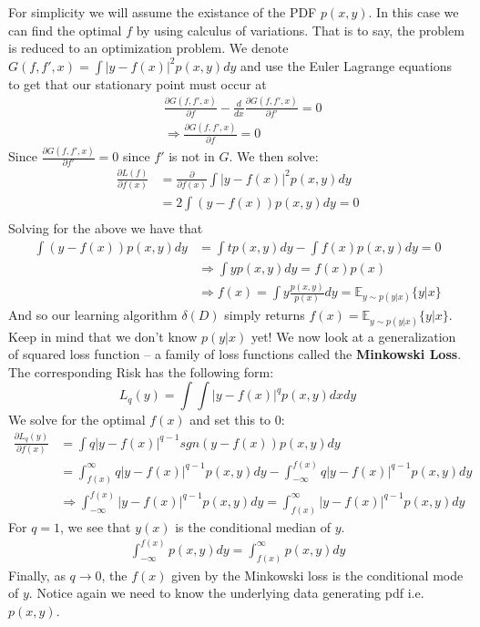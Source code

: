 \documentclass[]{article}
\theoremstyle{mattstyle}
\theoremstyle{definition}
\begin{document}
For simplicity we will assume the existance of the PDF $p(x,y)$. In this case we can find the optimal $f$ by using calculus of variations. That is to say, the problem is reduced to an optimization problem. We denote $G(f, f', x) = \int | y - f(x) |^2 p(x, y) dy$ and use the Euler Lagrange equations to get that our stationary point must occur at 
\begin{align*}
&\frac{\partial G(f, f', x)}{\partial f} - \frac{d}{dx}\frac{\partial G(f, f', x)}{\partial f'} = 0\\
&\Rightarrow \frac{\partial G(f, f', x)}{\partial f}=0
\end{align*}
Since $\frac{\partial G(f, f', x)}{\partial f'}=0$ since $f'$ is not in $G$. We then solve:
\begin{align*}
\frac{\partial L(f)}{\partial f(x)} &= \frac{\partial}{\partial f(x)}\int | y - f(x) |^2 p(x, y) dy\\
&=2 \int (y - f(x)) p(x, y) dy = 0\\
\end{align*}
Solving for the above we have that
\begin{align*}
\int (y - f(x)) p(x, y) dy &= \int t p(x, y) dy - \int f(x) p(x, y) dy = 0\\
&\Rightarrow \int y p(x, y) dy =  f(x)p(x) \\
&\Rightarrow f(x) = \int y \frac{p(x, y)}{p(x)} dy = \mathbb{E}_{y \sim p(y|x)}\{y|x\}
\end{align*}
And so our learning algorithm $\delta(D)$ simply returns $f(x) = \mathbb{E}_{y \sim p(y|x)}\{y|x\}$. Keep in mind that we don't know $p(y|x)$ yet! We now look at a generalization of squared loss function -- a family of loss functions called the \textbf{Minkowski Loss}. The corresponding Risk has the following form:
\begin{equation}
L_q(y) = \int\int |y-f(x)|^q p(x,y)dxdy
\end{equation}
We solve for the optimal $f(x)$ and set this to 0:
\begin{align}
\frac{\partial L_q(y)}{\partial f(x)} &= \int q|y-f(x)|^{q-1} sgn(y-f(x)) p(x,y)dy\\
&= \int_{f(x)}^{\infty} q|y-f(x)|^{q-1}p(x,y)dy-\int_{-\infty}^{f(x)} q|y-f(x)|^{q-1}p(x,y)dy\\
&\Rightarrow \int_{-\infty}^{f(x)} |y-f(x)|^{q-1}p(x,y)dy = \int_{f(x)}^{\infty} |y-f(x)|^{q-1}p(x,y)dy
\end{align}
For $q=1$, we see that $y(x)$ is the conditional median of $y$.
\begin{align}
\int_{-\infty}^{f(x)} p(x,y)dy = \int_{f(x)}^{\infty} p(x,y)dy
\end{align}
Finally, as $q \rightarrow 0$, the $f(x)$ given by the Minkowski loss is the conditional mode of $y$. Notice again we need to know the underlying data generating pdf i.e. $p(x, y)$.
\end{document}
